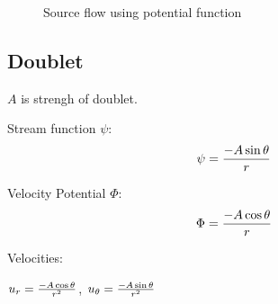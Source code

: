 \begin{figure}[h]
\begin{center}
\end{center}
\caption{Source flow using potential function}
\label{planarsourceflow}
\end{figure}


\subsection{Doublet}

$A$ is strengh of doublet.

Stream function $\psi$:
$$\psi = {-A \sin\theta \over r}$$

Velocity Potential $\Phi$:
$$\Phi = {-A\cos\theta \over r}$$

Velocities:

$u_r = {-A \cos\theta \over r^2}$, $u_\theta = {-A \sin\theta \over r^2}$


